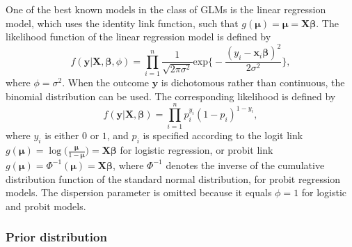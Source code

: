 \documentclass[
]{interact}
\begin{document}
One of the best known models in the class of GLMs is the linear
regression model, which uses the identity link function, such that
\(g(\boldsymbol{\mu}) = \boldsymbol{\mu} = \boldsymbol{X\beta}\). The
likelihood function of the linear regression model is defined by \[
f(\boldsymbol{y} | \boldsymbol{X}, \boldsymbol{\beta}, \phi) = \prod^n_{i=1} \frac{1}{\sqrt{2\pi\sigma^2}} \text{exp}
\Bigg\{
- \frac{(y_i - \boldsymbol{x}_i\boldsymbol{\beta})^2}{2\sigma^2}
\Bigg\},
\] where \(\phi = \sigma^2\). When the outcome \(\boldsymbol{y}\) is
dichotomous rather than continuous, the binomial distribution can be
used. The corresponding likelihood is defined by \[
f(\boldsymbol{y}|\boldsymbol{X}, \boldsymbol{\beta}) = \prod^n_{i=1} p_i^{y_i} (1 - p_i)^{1 - y_i},
\] where \(y_i\) is either \(0\) or \(1\), and \(p_i\) is specified
according to the logit link
\(g(\boldsymbol{\mu}) = \log\Big(\frac{\boldsymbol{\mu}}{1 - \boldsymbol{\mu}}\Big) = \boldsymbol{X\beta}\)
for logistic regression, or probit link
\(g(\boldsymbol{\mu}) = \Phi^{-1}(\boldsymbol{\mu}) = \boldsymbol{X\beta}\),
where \(\Phi^{-1}\) denotes the inverse of the cumulative distribution
function of the standard normal distribution, for probit regression
models. The dispersion parameter is omitted because it equals
\(\phi = 1\) for logistic and probit models.

\hypertarget{prior-distribution}{%
\subsubsection{Prior distribution}\label{prior-distribution}}
\end{document}
